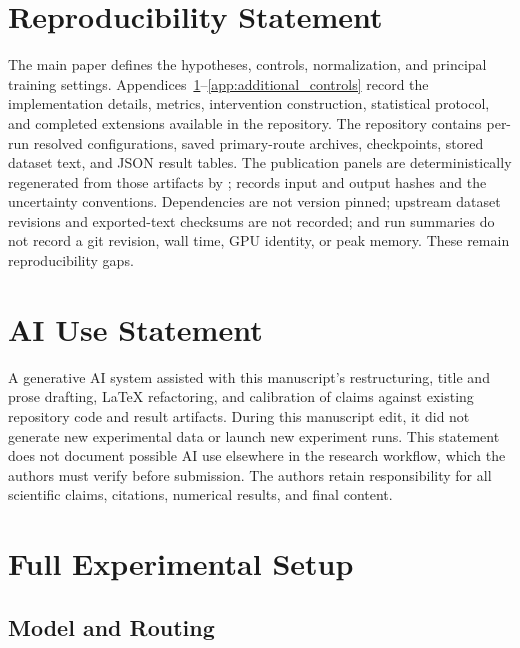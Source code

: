 \documentclass{article}
\begin{document}
\section*{Reproducibility Statement}
The main paper defines the hypotheses, controls, normalization, and principal
training settings. Appendices~\ref{app:setup}--\ref{app:additional_controls}
record the implementation details, metrics, intervention construction,
statistical protocol, and completed extensions available in the repository.
The repository contains per-run resolved configurations, saved primary-route
archives, checkpoints, stored dataset text, and JSON result tables.
The publication panels are deterministically regenerated from those artifacts
by ;
 records input and output hashes and
the uncertainty conventions. Dependencies
are not version pinned; upstream dataset revisions and exported-text checksums
are not recorded; and run summaries do not record a git revision, wall time, GPU
identity, or peak memory. These remain reproducibility gaps.

\section*{AI Use Statement}
A generative AI system assisted with this manuscript's restructuring, title and
prose drafting, LaTeX refactoring, and calibration of claims against existing
repository code and result artifacts. During this manuscript edit, it did not
generate new experimental data or launch new experiment runs. This statement
does not document possible AI use elsewhere in the research workflow, which the
authors must verify before submission. The authors retain responsibility for
all scientific claims, citations, numerical results, and final content.


\appendix

\section{Full Experimental Setup}
\label{app:setup}

\subsection{Model and Routing}
\end{document}
